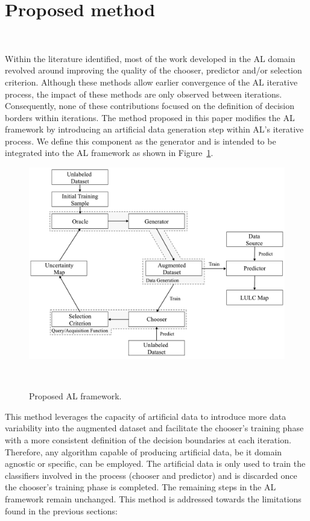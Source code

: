\documentclass[parskip=full]{scrartcl}
\begin{document}
\section{Proposed method}~\label{sec:proposed-method}

Within the literature identified, most of the work developed in the AL domain
revolved around improving the quality of the chooser, predictor and/or
selection criterion. Although these methods allow earlier convergence of the AL
iterative process, the impact of these methods are only observed between
iterations. Consequently, none of these contributions focused on the
definition of decision borders within iterations. The method proposed in this
paper modifies the AL framework by introducing an artificial data generation
step within AL's iterative process. We define this component as the generator
and is intended to be integrated into the AL framework as shown in
Figure~\ref{fig:al_new}. 

\begin{figure}[H]
	\centering
	\includegraphics[width=.85\linewidth]{../analysis/al_new}
	\caption{Proposed AL framework.
    }~\label{fig:al_new}
\end{figure}

This method leverages the capacity of artificial data to introduce more data
variability into the augmented dataset and facilitate the chooser's training
phase with a more consistent definition of the decision boundaries at each
iteration. Therefore, any algorithm capable of producing artificial data, be it
domain agnostic or specific, can be employed. The artificial data is only used
to train the classifiers involved in the process (chooser and predictor) and is
discarded once the chooser's training phase is completed. The remaining steps
in the AL framework remain unchanged. This method is addressed towards the
limitations found in the previous sections: 
\end{document}
